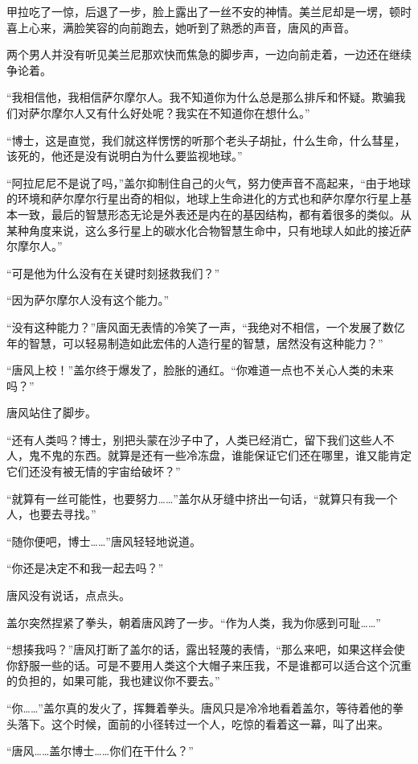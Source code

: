 甲拉吃了一惊，后退了一步，脸上露出了一丝不安的神情。美兰尼却是一塄，顿时喜上心来，满脸笑容的向前跑去，她听到了熟悉的声音，唐风的声音。

两个男人并没有听见美兰尼那欢快而焦急的脚步声，一边向前走着，一边还在继续争论着。

“我相信他，我相信萨尔摩尔人。我不知道你为什么总是那么排斥和怀疑。欺骗我们对萨尔摩尔人又有什么好处呢？我实在不知道你在想什么。”

“博士，这是直觉，我们就这样愣愣的听那个老头子胡扯，什么生命，什么彗星，该死的，他还是没有说明白为什么要监视地球。”

“阿拉尼尼不是说了吗，”盖尔抑制住自己的火气，努力使声音不高起来，“由于地球的环境和萨尔摩尔行星出奇的相似，地球上生命进化的方式也和萨尔摩尔行星上基本一致，最后的智慧形态无论是外表还是内在的基因结构，都有着很多的类似。从某种角度来说，这么多行星上的碳水化合物智慧生命中，只有地球人如此的接近萨尔摩尔人。”

“可是他为什么没有在关键时刻拯救我们？”

“因为萨尔摩尔人没有这个能力。”

“没有这种能力？”唐风面无表情的冷笑了一声，“我绝对不相信，一个发展了数亿年的智慧，可以轻易制造如此宏伟的人造行星的智慧，居然没有这种能力？”

“唐风上校！”盖尔终于爆发了，脸胀的通红。“你难道一点也不关心人类的未来吗？”

唐风站住了脚步。

“还有人类吗？博士，别把头蒙在沙子中了，人类已经消亡，留下我们这些人不人，鬼不鬼的东西。就算是还有一些冷冻盘，谁能保证它们还在哪里，谁又能肯定它们还没有被无情的宇宙给破坏？”

“就算有一丝可能性，也要努力……”盖尔从牙缝中挤出一句话，“就算只有我一个人，也要去寻找。”

“随你便吧，博士……”唐风轻轻地说道。

“你还是决定不和我一起去吗？”

唐风没有说话，点点头。

盖尔突然捏紧了拳头，朝着唐风跨了一步。“作为人类，我为你感到可耻……”

“想揍我吗？”唐风打断了盖尔的话，露出轻蔑的表情，“那么来吧，如果这样会使你舒服一些的话。可是不要用人类这个大帽子来压我，不是谁都可以适合这个沉重的负担的，如果可能，我也建议你不要去。”

“你……”盖尔真的发火了，挥舞着拳头。唐风只是冷冷地看着盖尔，等待着他的拳头落下。这个时候，面前的小径转过一个人，吃惊的看着这一幕，叫了出来。

“唐风……盖尔博士……你们在干什么？”

